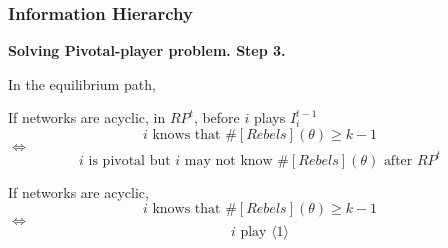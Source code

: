 \documentclass[10pt]{beamer}
\begin{document}
\begin{frame}
  \frametitle{Information Hierarchy}

\textbf{Solving Pivotal-player problem. Step 3.}

In the equilibrium path,  
\begin{lemma}
If networks are acyclic, in $RP^t$, before $i$ plays $I^{t-1}_i$
\[ \text{$i$ knows that $\#[Rebels](\theta)\geq k-1$}\] $\Leftrightarrow$ \[\text{$i$ is pivotal but $i$ may not know $\#[Rebels](\theta)$ after $RP^t$}\]
\end{lemma}

\begin{lemma}
If networks are acyclic, 
\[ \text{$i$ knows that $\#[Rebels](\theta)\geq k-1$}\] $\Leftrightarrow$ \[\text{$i$ play $\langle 1 \rangle$}\]
\end{lemma}




\end{frame}
\end{document}

